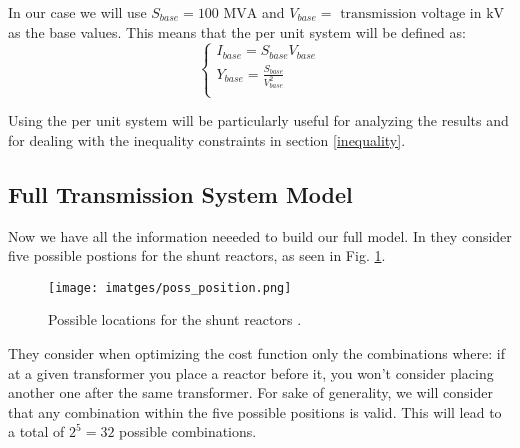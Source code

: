 \documentclass[a4paper,11pt, titlepage, twoside]{article}
\begin{document}
In our case we will use $S_{base} =100 \text{ MVA}$ and $V_{base} = \text{ transmission voltage in kV}$ as the base values. This means that the per unit system will be defined as:
\begin{equation}
    \begin{cases}
        I_{base} = S_{base}V_{base} \\
        Y_{base} = \frac{S_{base}}{V_{base}^2} \\
    \end{cases}
\end{equation}

Using the per unit system will be particularly useful for analyzing the results and for dealing with the inequality constraints in section \ref{inequality}.

\subsection{Full Transmission System Model}

Now we have all the information neeeded to build our full model. In \cite{paperbase} they consider five possible postions for the shunt reactors, as seen in Fig. \ref{fig:poss_position}. 
\begin{figure}[H]
    \centering
	\texttt{[image: imatges/poss\_position.png]}
	\caption{Possible locations for the shunt reactors \cite{paperbase}.}
    \label{fig:poss_position}
\end{figure}



They consider when optimizing the cost function only the combinations where: if at a given transformer you place a reactor before it, you won't consider placing another one
after the same transformer. For sake of generality, we will consider that any combination within the five possible positions is valid. This will lead to a total of $2^5 = 32$ possible combinations.
\end{document}

